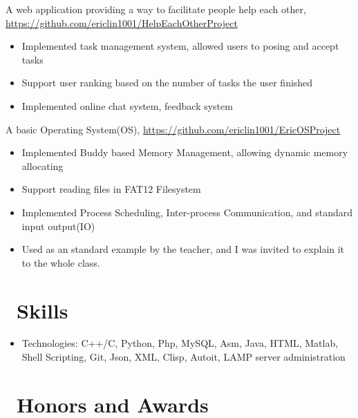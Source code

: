 \documentclass{resume}
\begin{document}
A web application providing a way to facilitate people help each other, \url{https://github.com/ericlin1001/HelpEachOtherProject}
\begin{itemize}
	\item Implemented task management system, allowed users to posing and accept tasks
\item Support user ranking based on the number of tasks the user finished
\item Implemented online chat system, feedback system
\end{itemize}
A basic Operating System(OS), \url{https://github.com/ericlin1001/EricOSProject}
\begin{itemize}
	\item Implemented Buddy based Memory Management, allowing dynamic memory allocating
	\item Support reading files in FAT12 Filesystem 
	\item Implemented Process Scheduling, Inter-process Communication, and standard input output(IO)
	\item Used as an standard example by the teacher, and I was invited to explain it to the whole class.
\end{itemize}



\section{\faCogs\ Skills}
\begin{itemize}[parsep=0.5ex]
	\item Technologies: C++/C, Python, Php, MySQL, Asm, Java, HTML, Matlab, Shell Scripting, Git, Json, XML, Clisp, Autoit, LAMP server administration
\end{itemize}

\section{\faHeartO\ Honors and Awards}
\end{document}
